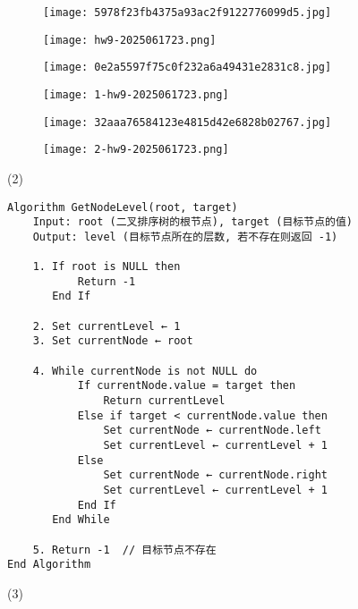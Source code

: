 \begin{figure}[H]
\centering
\texttt{[image: 5978f23fb4375a93ac2f9122776099d5.jpg]}
\label{}
\end{figure}

\begin{exercise}
\begin{figure}[H]
\centering
\texttt{[image: hw9-2025061723.png]}
\label{}
\end{figure}
\end{exercise}
\begin{figure}[H]
\centering
\texttt{[image: 0e2a5597f75c0f232a6a49431e2831c8.jpg]}
\label{}
\end{figure}

\begin{exercise}
\begin{figure}[H]
\centering
\texttt{[image: 1-hw9-2025061723.png]}
\label{}
\end{figure}
\end{exercise}
\begin{figure}[H]
\centering
\texttt{[image: 32aaa76584123e4815d42e6828b02767.jpg]}
\label{}
\end{figure}

\begin{exercise}
\begin{figure}[H]
\centering
\texttt{[image: 2-hw9-2025061723.png]}
\label{}
\end{figure}
\end{exercise}
(2)

\begin{lstlisting}
Algorithm GetNodeLevel(root, target)
    Input: root (二叉排序树的根节点), target (目标节点的值)
    Output: level (目标节点所在的层数, 若不存在则返回 -1)

    1. If root is NULL then
           Return -1
       End If

    2. Set currentLevel ← 1
    3. Set currentNode ← root

    4. While currentNode is not NULL do
           If currentNode.value = target then
               Return currentLevel
           Else if target < currentNode.value then
               Set currentNode ← currentNode.left
               Set currentLevel ← currentLevel + 1
           Else
               Set currentNode ← currentNode.right
               Set currentLevel ← currentLevel + 1
           End If
       End While

    5. Return -1  // 目标节点不存在
End Algorithm
\end{lstlisting}
(3)

